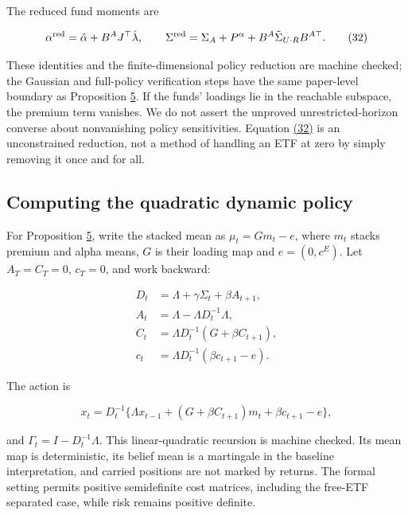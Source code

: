 \documentclass[11pt]{article}
\begin{document}
The reduced fund moments are

\begin{equation*}
\alpha^{\rm red}=\hat\alpha+B^A J^\top\hat\lambda,\qquad
\Sigma^{\rm red}=\Sigma_A+P^\alpha+B^A\tilde\Sigma_{U\cdot R}B^{A\top}.
\tag{32}\label{eq:32}
\end{equation*}

These identities and the finite-dimensional policy reduction are machine checked; the Gaussian and full-policy verification steps have the same paper-level boundary as Proposition \hyperref[res:Proposition-5]{5}. If the funds' loadings lie in the reachable subspace, the premium term vanishes. We do not assert the unproved unrestricted-horizon converse about nonvanishing policy sensitivities. Equation \hyperref[eq:32]{(32)} is an unconstrained reduction, not a method of handling an ETF at zero by simply removing it once and for all.

\subsection{Computing the quadratic dynamic policy}\label{sec:B.3}

For Proposition \hyperref[res:Proposition-5]{5}, write the stacked mean as \(\mu_t=Gm_t-e\), where \(m_t\) stacks premium and alpha means, \(G\) is their loading map and \(e=(0,c^E)\). Let \(A_T=C_T=0\), \(c_T=0\), and work backward:

\begin{equation*}
\begin{aligned}
D_t&=\Lambda+\gamma\Sigma_t+\beta A_{t+1},\\
A_t&=\Lambda-\Lambda D_t^{-1}\Lambda,\\
C_t&=\Lambda D_t^{-1}(G+\beta C_{t+1}),\\
c_t&=\Lambda D_t^{-1}(\beta c_{t+1}-e).
\end{aligned}
\tag{33}\label{eq:33}
\end{equation*}

The action is

\begin{equation*}
x_t=D_t^{-1}\{\Lambda x_{t-1}+(G+\beta C_{t+1})m_t+\beta c_{t+1}-e\},
\tag{34}\label{eq:34}
\end{equation*}

and \(\Gamma_t=I-D_t^{-1}\Lambda\). This linear-quadratic recursion is machine checked. Its mean map is deterministic, its belief mean is a martingale in the baseline interpretation, and carried positions are not marked by returns. The formal setting permits positive semidefinite cost matrices, including the free-ETF separated case, while risk remains positive definite.
\end{document}
